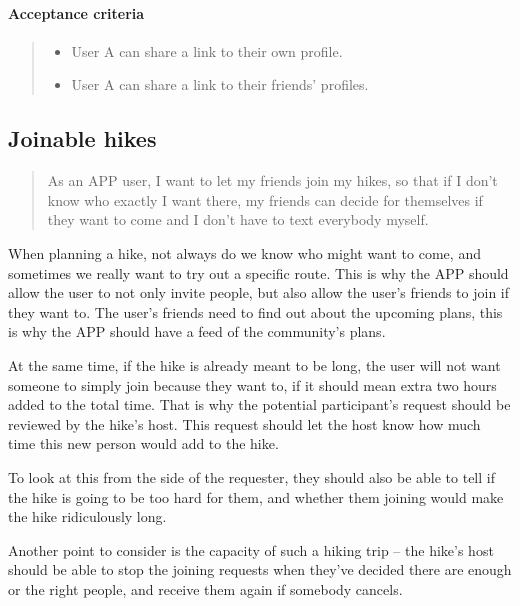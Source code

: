 \paragraph*{Acceptance criteria}
\begin{quote}
    \begin{itemize}
        \item User A can share a link to their own profile.
        \item User A can share a link to their friends' profiles.
    \end{itemize}
\end{quote}


\subsection{Joinable hikes}\label{US:friends-join-hikes}
\begin{quote}
As an APP user, I want to let my friends join my hikes, so that if I don't know who exactly I want there, my friends can decide for themselves if they want to come and I don't have to text everybody myself.
\end{quote}

When planning a hike, not always do we know who might want to come, and sometimes we really want to try out a specific route.
This is why the APP should allow the user to not only invite people, but also allow the user's friends to join if they want to.
The user's friends need to find out about the upcoming plans, this is why the APP should have a feed of the community's plans.

At the same time, if the hike is already meant to be long, the user will not want someone to simply join because they want to, if it should mean extra two hours added to the total time.
That is why the potential participant's request should be reviewed by the hike's host.
This request should let the host know how much time this new person would add to the hike.

To look at this from the side of the requester, they should also be able to tell if the hike is going to be too hard for them, and whether them joining would make the hike ridiculously long.

Another point to consider is the capacity of such a hiking trip -- the hike's host should be able to stop the joining requests when they've decided there are enough or the right people, and receive them again if somebody cancels.

